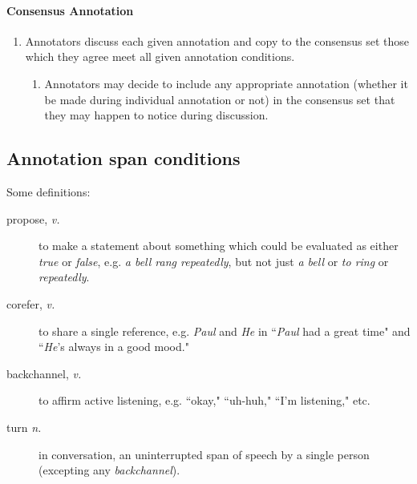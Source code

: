 \documentclass[a4paper,12pt]{article}
\begin{document}
    \paragraph{Consensus Annotation}
        \begin{enumerate}
            \item Annotators discuss each given annotation and copy to the consensus set those which they agree meet all given annotation conditions.
                \begin{enumerate}
                    \item Annotators may decide to include any appropriate annotation (whether it be made during individual annotation or not) in the consensus set that they may happen to notice during discussion.
                \end{enumerate}
        \end{enumerate}

    \subsection{Annotation span conditions} \label{conditions}
        Some definitions:
        \begin{description}
            \item[propose, \emph{v.}] to make a statement about something which could be evaluated as either \emph{true} or \emph{false},
                e.g. \emph{a bell rang repeatedly}, but not just \emph{a bell} or \emph{to ring} or \emph{repeatedly}.
            \item[corefer, \emph{v.}] to share a single reference,
                e.g. \emph{Paul} and \emph{He} in ``\emph{Paul} had a great time" and ``\emph{He}'s always in a good mood."
            \item[backchannel, \emph{v.}] to affirm active listening, e.g. ``okay," ``uh-huh," ``I'm listening," etc.
            \item[turn \emph{n.}] in conversation, an uninterrupted span of speech by a single person (excepting any \emph{backchannel}).
        \end{description}
\end{document}
